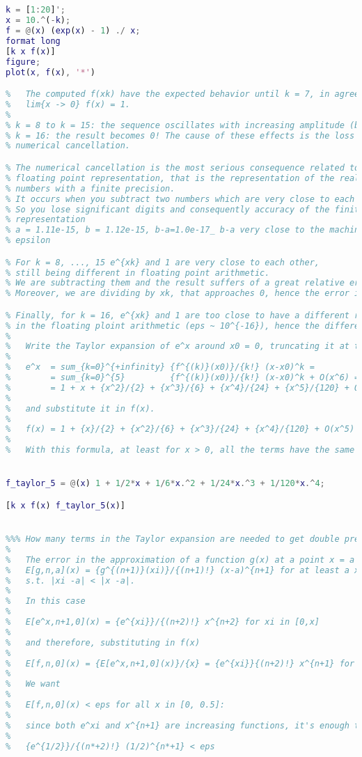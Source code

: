 \documentclass[12pt, a4paper]{report}
\newtheorem[style=M,bodystyle=\normalfont]{theorem}{Theorem}
\newtheorem[style=M,bodystyle=\normalfont]{corollary}{Corollary}
\newtheorem[style=M,bodystyle=\normalfont]{lemma}{Lemma}
\newtheorem[style=M,bodystyle=\normalfont]{definition}{Definition}
\begin{document}
    \begin{Answer}[ref=7]
        \begin{lstlisting}[language=Matlab]
%   Evaluate f(x) for values of x around zero (try with xk = 10^{-k}, k in [1,20]). What do you obtain? Explain the results.


k = [1:20]';
x = 10.^(-k);
f = @(x) (exp(x) - 1) ./ x;
format long
[k x f(x)]
figure;
plot(x, f(x), '*')

% 	The computed f(xk) have the expected behavior until k = 7, in agreement with
% 	lim{x -> 0} f(x) = 1.
% 	
% k = 8 to k = 15: the sequence oscillates with increasing amplitude (bigger and bigger). 
% k = 16: the result becomes 0! The cause of these effects is the loss of accuracy due to 
% numerical cancellation. 

% The numerical cancellation is the most serious consequence related to the
% floating point representation, that is the representation of the real
% numbers with a finite precision. 
% It occurs when you subtract two numbers which are very close to each other.
% So you lose significant digits and consequently accuracy of the finite 
% representation
% a = 1.11e-15, b = 1.12e-15, b-a=1.0e-17_ b-a very close to the machine
% epsilon

% For k = 8, ..., 15 e^{xk} and 1 are very close to each other, 
% still being different in floating point arithmetic. 
% We are subtracting them and the result suffers of a great relative error. 
% Moreover, we are dividing by xk, that approaches 0, hence the error is magnified.

% Finally, for k = 16, e^{xk} and 1 are too close to have a different representation 
% in the floating ploint arithmetic (eps ~ 10^{-16}), hence the difference is 0.
% 	
% 	Write the Taylor expansion of e^x around x0 = 0, truncating it at the fifth order:
% 
% 	e^x  = sum_{k=0}^{+infinity} {f^{(k)}(x0)}/{k!} (x-x0)^k = 
%        = sum_{k=0}^{5}         {f^{(k)}(x0)}/{k!} (x-x0)^k + O(x^6) =
% 		 = 1 + x + {x^2}/{2} + {x^3}/{6} + {x^4}/{24} + {x^5}/{120} + O(x^6)
% 
% 	and substitute it in f(x).
% 
% 	f(x) = 1 + {x}/{2} + {x^2}/{6} + {x^3}/{24} + {x^4}/{120} + O(x^5)
% 
% 	With this formula, at least for x > 0, all the terms have the same sign, so no numerical cancellation occurs.


f_taylor_5 = @(x) 1 + 1/2*x + 1/6*x.^2 + 1/24*x.^3 + 1/120*x.^4;

[k x f(x) f_taylor_5(x)]


%%% How many terms in the Taylor expansion are needed to get double precision accuracy (16 decimal digits) for all x in [0, 1/2]?
% 	
% 	The error in the approximation of a function g(x) at a point x = a with its Taylor expansion up to order n is
% 	E[g,n,a](x) = {g^{(n+1)}(xi)}/{(n+1)!} (x-a)^{n+1} for at least a xi
% 	s.t. |xi -a| < |x -a|.
% 	
% 	In this case
% 	
% 	E[e^x,n+1,0](x) = {e^{xi}}/{(n+2)!} x^{n+2} for xi in [0,x]
% 
% 	and therefore, substituting in f(x) 
% 
% 	E[f,n,0](x) = {E[e^x,n+1,0](x)}/{x} = {e^{xi}}{(n+2)!} x^{n+1} for xi in [0,x]
% 
% 	We want 
% 
% 	E[f,n,0](x) < eps for all x in [0, 0.5]:
% 
% 	since both e^xi and x^{n+1} are increasing functions, it's enough to choose xi = x = 0.5 and seek the first n* such that
% 
% 	{e^{1/2}}/{(n*+2)!} (1/2)^{n*+1} < eps



\end{lstlisting}
\end{Answer}
\end{document}

